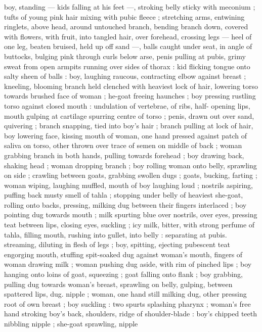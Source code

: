 boy, standing --- kids falling at his feet ---, stroking belly sticky with 
meconium ; tufts of young pink hair mixing with pubic fleece ; 
stretching arms, entwining ringlets, above head, around untouched 
branch, bending branch down, covered with flowers, with fruit, into 
tangled hair, over forehead, crossing legs --- heel of one leg, beaten 
bruised, held up off sand ---, balls caught under seat, in angle of 
buttocks, bulging pink through curls below arse, penis pulling at 
pubis, grimy sweat from open armpits running over sides of thorax : 
kid flicking tongue onto salty sheen of balls : boy, laughing raucous, 
contracting elbow against breast ; kneeling, blooming branch held 
clenched with heaviest lock of hair, lowering torso towards brushed 
face of woman ; he-goat freeing haunches ; boy pressing rustling 
torso against closed mouth : undulation of vertebrae, of ribs, half- 
opening lips, mouth gulping at cartilage spurring centre of torso ; 
penis, drawn out over sand, quivering ; branch snapping, tied into 
boy's hair ; branch pulling at lock of hair, boy lowering face, kissing 
mouth of woman, one hand pressed against patch of saliva on torso, 
other thrown over trace of semen on middle of back ; woman 
grabbing branch in both hands, pulling towards forehead ; boy 
drawing back, shaking head ; woman dropping branch ; boy rolling 
woman onto belly, sprawling on side ; crawling between goats, 
grabbing swollen dugs ; goats, bucking, farting ; woman wiping, 
laughing muffled, mouth of boy laughing loud ; nostrils aspiring, 
puffing back musty smell of tahla ; stopping under belly of heaviest 
she-goat, rolling onto backs, pressing, milking dug between their 
fingers interlaced ; boy pointing dug towards mouth ; milk spurting 
blue over nostrils, over eyes, pressing teat between lips, closing 
eyes, suckling ; icy milk, bitter, with strong perfume of tahla, filling 
mouth, rushing into gullet, into belly : separating at pubis. 
streaming, diluting in flesh of legs ; boy, spitting, ejecting pubescent 
teat engorging mouth, stuffing spit-soaked dug against woman's 
mouth, fingers of woman drawing milk ; woman pushing dug aside, 
with rim of pinched lips ; boy hanging onto loins of goat, squeezing 
; goat falling onto flank ; boy grabbing, pulling dug towards woman's 
breast, sprawling on belly, gulping, between spattered lips, dug. 
nipple ; woman, one hand still milking dug, other pressing root of 
own breast ; boy suckling : two spurts splashing pharynx ; woman's 
free hand stroking boy's back, shoulders, ridge of shoulder-blade : 
boy's chipped teeth nibbling nipple ; she-goat sprawling, nipple 
